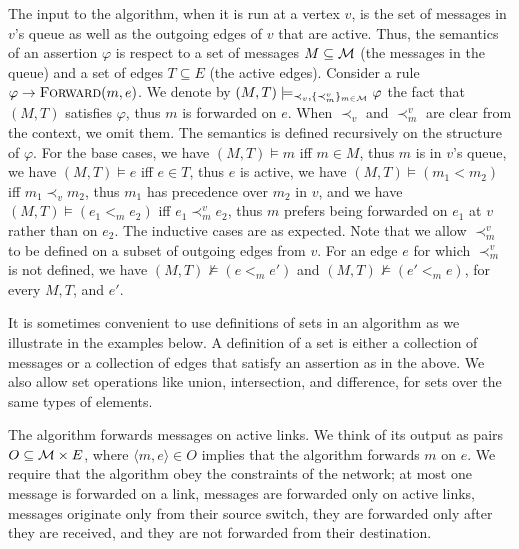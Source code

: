 \documentclass[11pt,eepic]{article}
\newcommand{\zug}[1]{\langle #1  \rangle}
\newcommand{\set}[1]{\{ #1  \}}
\newcommand{\M}{{\cal M}}
\newcommand{\Forw}{\mbox{\sc Forward}}
\begin{document}
		The input to the algorithm, when it is run at a vertex $v$, is the set of messages in $v$'s queue as well as the outgoing edges of $v$ that are active. Thus, the semantics of an assertion $\varphi$ is respect to a set of messages $M \subseteq \M$ (the messages in the queue) and a set of edges $T \subseteq E$ (the active edges). Consider a rule $\varphi \rightarrow \Forw(m,e)$. We denote by $(M, T) \models_{\prec_v, \set{\prec_m^v}_{m \in \M}} \varphi$ the fact that $(M,T)$ satisfies $\varphi$, thus $m$ is forwarded on $e$. When $\prec_v$ and $\prec_m^v$ are clear from the context, we omit them. The semantics is defined recursively on the structure of $\varphi$. For the base cases, we have $(M, T) \models m$ iff $m \in M$, thus $m$ is in $v$'s queue, we have $(M,T) \models e$ iff $e \in T$, thus $e$ is active, we have $(M,T) \models (m_1 < m_2)$ iff $m_1 \prec_v m_2$, thus $m_1$ has precedence over $m_2$ in $v$, and we have $(M,T) \models (e_1 <_m e_2)$ iff $e_1 \prec_m^v e_2$, thus $m$ prefers being forwarded on $e_1$ at $v$ rather than on $e_2$. The inductive cases are as expected. Note that we allow $\prec_m^v$ to be defined on a subset of outgoing edges from $v$. For an edge $e$ for which $\prec_m^v$ is not defined, we have $(M,T) \not \models (e <_m e')$ and $(M,T) \not \models (e' <_m e)$, for every $M, T$, and $e'$. 

		It is sometimes convenient to use definitions of sets in an algorithm as we illustrate in the examples below. A definition of a set is either a collection of messages or a collection of edges that satisfy an assertion as in the above. We also allow set operations like union, intersection, and difference, for sets over the same types of elements. 

		The algorithm forwards messages on active links. We think of its output as pairs $O \subseteq \M \times E$, where $\zug{m, e} \in O$ implies that the algorithm forwards $m$ on $e$. We require that the algorithm obey the constraints of the network; at most one message is forwarded on a link, messages are forwarded only on active links, messages originate only from their source switch, they are forwarded only after they are received, and they are not forwarded from their destination.
\end{document}
